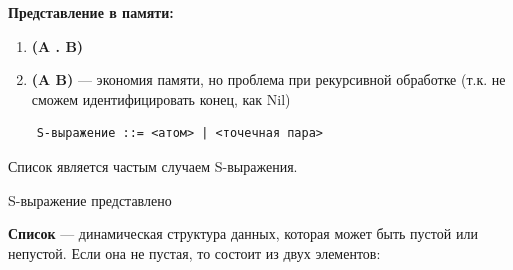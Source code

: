 \textbf{Представление в памяти:}

\begin{enumerate}
	\item \textbf{(A . B)}
	\begin{figure}[ht!]
	\end{figure}
	\item \textbf{(A B)} --- экономия памяти, но проблема при рекурсивной обработке (т.к. не сможем идентифицировать конец, как Nil)
	\begin{figure}[ht!]
	\end{figure}
\end{enumerate}

\begin{lstlisting}
	S-выражение ::= <атом> | <точечная пара>
\end{lstlisting}

Список является частым случаем S-выражения.

S-выражение представлено 

\begin{figure}[ht!]
\end{figure}

\textbf{Список} --- динамическая структура данных, которая может быть
пустой или непустой. Если она не пустая, то состоит из двух элементов:


